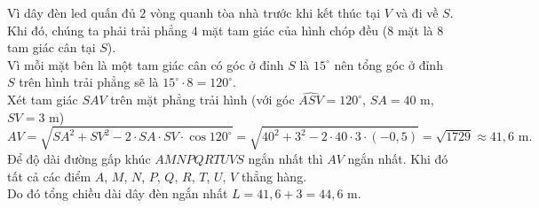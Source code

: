 \begin{ex}
{\begin{center}
		\end{center}
		Vì dây đèn led quấn đủ $2$ vòng quanh tòa nhà trước khi kết thúc tại $V$ và đi về $S$. Khi đó, chúng ta phải trải phẳng $4$ mặt tam giác của hình chóp đều ($8$ mặt là $8$ tam giác cân tại $S$).\\
		Vì mỗi mặt bên là một tam giác cân có góc ở đỉnh $S$ là $15^\circ$ nên tổng góc ở đỉnh $S$ trên hình trải phẳng sẽ là $15^\circ \cdot 8 = 120^\circ$.\\
		Xét tam giác $SAV$ trên mặt phẳng trải hình (với góc $\widehat{ASV} = 120^\circ$, $SA = 40$ m, $SV = 3$ m)
		$$AV = \sqrt{SA^2 + SV^2 - 2 \cdot SA \cdot SV \cdot \cos 120^\circ} = \sqrt{40^2 + 3^2 - 2 \cdot 40 \cdot 3 \cdot (-0,5)} = \sqrt{1729} \approx 41{,}6 \text{ m}.$$
		Để độ dài đường gấp khúc $AMNPQRTUVS$ ngắn nhất thì $AV$ ngắn nhất. Khi đó tất cả các điểm $A$, $M$, $N$, $P$, $Q$, $R$, $T$, $U$, $V$ thẳng hàng.\\
		Do đó tổng chiều dài dây đèn ngắn nhất
		$L = 41{,}6 + 3 = 44{,}6$ m.
	}
\end{ex}


